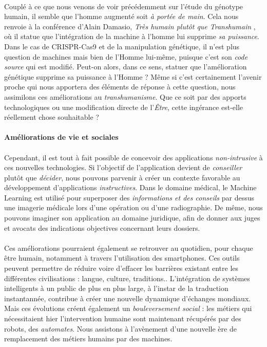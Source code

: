 \paragraph{} Couplé à ce que nous venons de voir précédemment sur l'étude du génotype humain, il semble que
l'homme augmenté soit \emph{à portée de main}. Cela nous renvoie à la conférence d'Alain Damasio, \emph{Très humain
plutôt que Transhumain} \cite{Damasio2}, où il statue que l'intégration de la machine à l'homme lui supprime \emph{
sa puissance}. Dans le cas de CRISPR-Cas9 et de la manipulation génétique, il n'est plus question de machines
mais bien de l'Homme lui-même, puisque c'est son \emph{code source} qui est modifié. Peut-on alors, dans ce sens,
statuer que l'amélioration génétique supprime sa puissance à l'Homme ? Même si c'est certainement l'avenir proche qui
nous apportera des éléments de réponse à cette question, nous assimilons ces améliorations au \emph{transhumanisme}.
Que ce soit par des apports technologiques ou une modification directe de l'\emph{Être}, cette ingérance est-elle
réellement chose souhaitable ?

\paragraph{Améliorations de vie et sociales}

\paragraph{} Cependant, il est tout à fait possible de concevoir des applications \emph{non-intrusive} à ces
nouvelles technologies. Si l'objectif de l'application devient de \emph{conseiller} plutôt que \emph{décider},
nous pouvons parvenir à créer un contexte favorable au développement d'applications \emph{instructives}. Dans le
domaine médical, le Machine Learning est utilisé pour superposer des \emph{informations et des conseils} par dessus
une imagerie médicale lors d'une opération ou d'une radiographie. De même, nous pouvons imaginer son 
application au domaine juridique, afin de donner aux juges et avocats des indications objectives concernant leurs
dossiers.

\paragraph{} Ces améliorations pourraient également se retrouver au quotidien, pour chaque être humain, notamment
à travers l'utilisation des smartphones. Ces outils peuvent permettre de réduire voire d'effacer les barrières 
existant entre les différentes civilisations : langue, culture, traditions.. L'intégration de systèmes intelligents 
à un public de plus en plus large, à l'instar de la traduction instantannée, contribue à créer une nouvelle
dynamique d'échanges mondiaux. Mais ces évolutions créent également un \emph{bouleversement social} : les métiers
qui nécessitaient hier l'intervention humaine sont maintenant récupérés par des robots, des \emph{automates}.
Nous assistons à l'avènement d'une nouvelle ère de remplacement des métiers humains par des machines.

